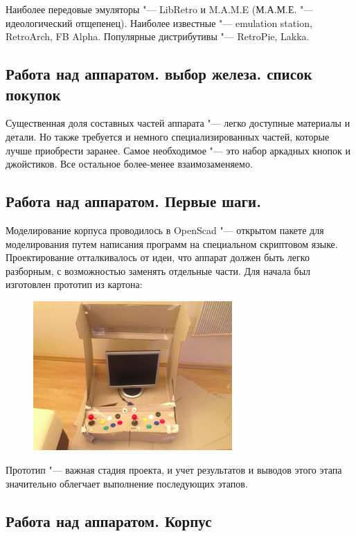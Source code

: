 \documentclass[10pt, a5paper]{article}
\begin{document}
Наиболее передовые эмуляторы "--- LibRetro и M.A.M.E \linebreak(М.А.М.Е. "--- идеологический отщепенец). Наиболее известные  "--- emulation station, RetroArch, FB Alpha. Популярные дистрибутивы "--- RetroPie, Lakka.

\subsection*{Работа над аппаратом. выбор железа. список покупок}

Существенная доля составных частей аппарата "--- легко доступные материалы и детали. Но также требуется и немного специализированных частей, которые лучше приобрести заранее.
Самое необходимое "--- это набор аркадных кнопок и джойстиков. Все \linebreak остальное более-менее взаимозаменяемо.

\subsection*{Работа над аппаратом. Первые шаги.}

Моделирование корпуса проводилось в OpenScad "--- \linebreak открытом пакете для моделирования путем написания программ на специальном скриптовом языке. Проектирование отталкивалось от идеи, что аппарат должен быть легко разборным, с возможностью заменять отдельные части.
Для начала был изготовлен прототип из картона:

\begin{figure}[h!]
  \centering
  \includegraphics[height=5.7cm]{27_2016_Sorokin2.png}
\end{figure}


Прототип "--- важная стадия проекта, и учет результатов и выводов этого этапа значительно облегчает выполнение последующих этапов.

\subsection*{Работа над аппаратом. Корпус}
\end{document}

